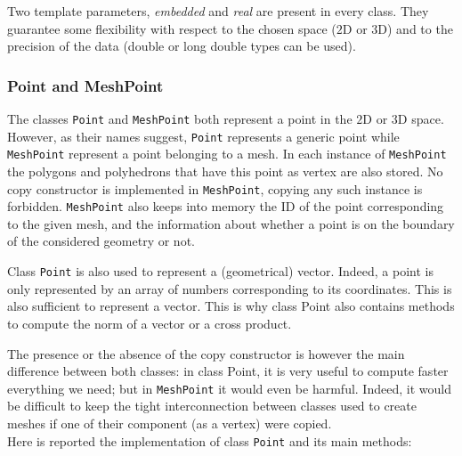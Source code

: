 Two template parameters, \textit{embedded} and \textit{real} are present in every class. They guarantee some flexibility with respect to the chosen space ($2$D or $3$D) and to the precision of the data (double or long double types can be used). 

\subsubsection{Point and MeshPoint} \label{pts}
The classes \verb|Point| and \verb|MeshPoint| both represent a point in the $2$D or $3$D space. However, as their names suggest, \verb|Point| represents a generic point while \verb|MeshPoint| represent a point belonging to a mesh. In each instance of \verb|MeshPoint| the polygons and polyhedrons that have this point as vertex are also stored. No copy constructor is implemented in \verb|MeshPoint|, copying any such instance is forbidden. \verb|MeshPoint| also keeps into memory the ID of the point corresponding to the given mesh, and the information about whether a point is on the boundary of the considered geometry or not. 

Class \verb|Point| is also used to represent a (geometrical) vector. Indeed, a point is only represented by an array of numbers corresponding to its coordinates. This is also sufficient to represent a vector. This is why class Point also contains methods to compute the norm of a vector or a cross product. 

The presence or the absence of the copy constructor is however the main difference between both classes: in class Point, it is very useful to compute faster everything we need; but in \verb|MeshPoint| it would even be harmful. Indeed, it would be difficult to keep the tight interconnection between classes used to create meshes if one of their component (as a vertex) were copied. \\

Here is reported the implementation of class \verb|Point| and its main methods: \\


